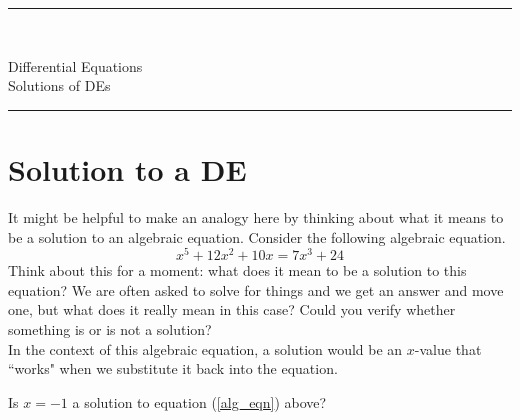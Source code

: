 \documentclass[12pt]{article}
\newcommand{\<}{\langle}
\renewcommand{\>}{\rangle}
\begin{document}
\noindent\rule{7in}{0.4pt}\\
\begin{center}
{\sc Differential Equations\\
Solutions of DEs}
\end{center}
\noindent\rule{7in}{0.4pt}
\section*{Solution to a DE}
\doublespacing

\noindent  It might be helpful to make an analogy here by thinking about what it means to be a solution
to an algebraic equation.  Consider the following algebraic equation.
	\begin{equation} x^5 + 12x^2 +10x = 7x^3 + 24  \label{alg_eqn} \end{equation}
\noindent  Think about this for a moment:  what does it mean to be a solution to this equation?  We are often
asked to solve for things and we get an answer and move one, but what does it really mean in this case?
Could you verify whether something is or is not a solution?\\

\noindent  In the context of this algebraic equation, a solution would be an $x$-value that ``works" when we substitute
it back into the equation.  

  Is $x = -1$ a solution to equation (\ref{alg_eqn}) above?
\newpage

\end{document}
